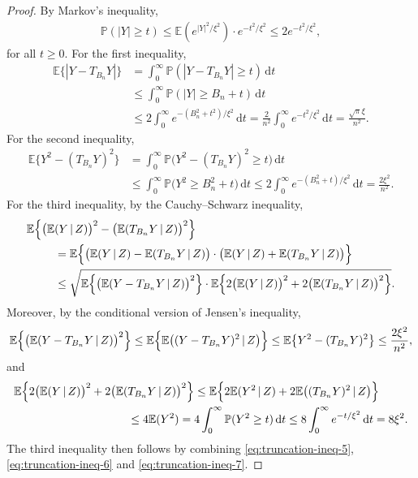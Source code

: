\documentclass[10pt,a4paper]{amsart}
\begin{document}
\begin{proof}
    By Markov's inequality,
    \begin{align*}
        \mathbb{P}(|Y|\geq t) \leq \mathbb{E}(e^{|Y|^2/\xi^2}) \cdot e^{-t^2/\xi^2} \leq 2e^{-t^2/\xi^2},
    \end{align*}
    for all $t\geq 0$. For the first inequality,
    \begin{align*}
        \mathbb{E}\{|Y - T_{B_n}Y|\} &= \int_0^{\infty} \mathbb{P}(|Y - T_{B_n}Y| \geq t) \,\mathrm{d}t\\
        &\leq \int_0^{\infty} \mathbb{P}(|Y| \geq B_n + t) \,\mathrm{d}t\\
        &\leq 2\int_0^{\infty} e^{-(B_n^2 + t^2)/\xi^2}\,\mathrm{d}t = \frac{2}{n^2} \int_0^{\infty} e^{-t^2/\xi^2}\,\mathrm{d}t = \frac{\sqrt{\pi} \xi}{n^2}.
    \end{align*}
    For the second inequality,
    \begin{align*}
        \mathbb{E}\bigl\{Y^2 - (T_{B_n}Y)^2\bigr\} &= \int_0^{\infty} \mathbb{P}\bigl(Y^2 - (T_{B_n}Y)^2 \geq t\bigr)\,\mathrm{d}t\\
        &\leq \int_0^{\infty} \mathbb{P}\bigl(Y^2 \geq B_n^2 + t\bigr) \,\mathrm{d}t \leq 2 \int_0^{\infty} e^{-(B_n^2 + t)/\xi^2} \,\mathrm{d}t = \frac{2\xi^2}{n^2}.
    \end{align*}
    For the third inequality, by the Cauchy--Schwarz inequality,
    \begin{align}
        \mathbb{E}\Bigl\{\bigl(\mathbb{E}&(Y\,|\,Z)\bigr)^2 - \bigl(\mathbb{E}(T_{B_n}Y\,|\,Z)\bigr)^2 \Bigr\}\nonumber\\
        &= \mathbb{E}\Bigl\{\bigl(\mathbb{E}(Y\,|\,Z) -\mathbb{E}(T_{B_n}Y\,|\,Z)\bigr) \cdot \bigl(\mathbb{E}(Y\,|\,Z) +\mathbb{E}(T_{B_n}Y\,|\,Z)\bigr) \Bigr\} \nonumber\\
        &\leq \sqrt{\mathbb{E}\Bigl\{\bigl(\mathbb{E}(Y-T_{B_n}Y\,|\,Z)\bigr)^2\Bigr\} \cdot \mathbb{E}\Bigl\{2\bigl(\mathbb{E}(Y\,|\,Z)\bigr)^2 + 2\bigl(\mathbb{E}(T_{B_n}Y\,|\,Z)\bigr)^2 \Bigr\}}. \label{eq:truncation-ineq-5}
    \end{align}
    Moreover, by the conditional version of Jensen's inequality,
    \begin{align}
        \mathbb{E}\Bigl\{\bigl(\mathbb{E}(Y-T_{B_n}Y\,|\,Z)\bigr)^2\Bigr\} \leq \mathbb{E}\Bigl\{\mathbb{E}\bigl((Y-T_{B_n}Y)^2\,|\,Z\bigr)\Bigr\} \leq \mathbb{E}\bigl\{Y^2 - (T_{B_n}Y)^2\bigr\} \leq \frac{2\xi^2}{n^2}, \label{eq:truncation-ineq-6}
    \end{align}
    and
    \begin{align}
        \mathbb{E}\Bigl\{2\bigl(\mathbb{E}(Y\,|\,Z)\bigr)^2 + 2\bigl(\mathbb{E}(&T_{B_n}Y\,|\,Z)\bigr)^2 \Bigr\} \leq \mathbb{E}\Bigl\{2\mathbb{E}(Y^2\,|\,Z) + 2\mathbb{E}\bigl((T_{B_n}Y)^2\,|\,Z\bigr) \Bigr\}\nonumber\\
        &\leq 4\mathbb{E}(Y^2) = 4 \int_0^{\infty} \mathbb{P}(Y^2\geq t)\,\mathrm{d}t \leq 8 \int_0^{\infty} e^{-t/\xi^2}\,\mathrm{d}t = 8\xi^2. \label{eq:truncation-ineq-7}
    \end{align}
    The third inequality then follows by combining \eqref{eq:truncation-ineq-5}, \eqref{eq:truncation-ineq-6} and \eqref{eq:truncation-ineq-7}.
    

\end{proof}
\end{document}
